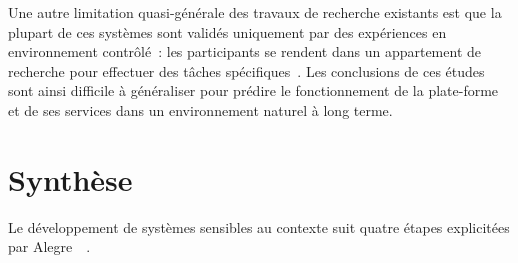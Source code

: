 Une autre limitation quasi-générale des travaux de recherche existants est que la plupart de ces systèmes sont validés uniquement par
des expériences en environnement contrôlé~: les participants se rendent dans un appartement de recherche pour effectuer des tâches 
spécifiques~\parencite{rashidi2013survey,rantz2011using}. 
Les conclusions de ces études sont ainsi difficile à généraliser pour prédire le
fonctionnement de la plate-forme et de ses services dans un environnement 
naturel à long terme.

\section{Synthèse}

Le développement de systèmes sensibles au contexte suit quatre étapes explicitées par Alegre~\etal~\parencite{alegre2016engineering}.
